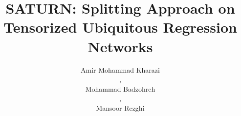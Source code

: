 \documentclass[runningheads]{llncs}
\begin{document}
\pagestyle{headings}
\mainmatter
\def\ECCV16SubNumber{***}  %

\title{SATURN: Splitting Approach on Tensorized Ubiquitous Regression Networks}



\author{%
\begin{tabular}{c} Amir Mohammad Kharazi 
\end{tabular}
,
\begin{tabular}{c} Mohammad Badzohreh  
\end{tabular}
,
\begin{tabular}{c} Mansoor Rezghi 
\end{tabular} 
}


\maketitle
\end{document}
